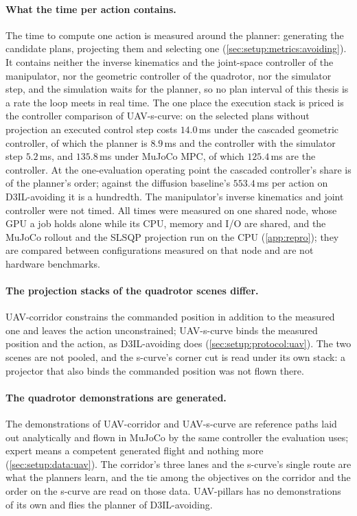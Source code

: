 \paragraph{What the time per action contains.} The time to compute one action is measured around the
planner: generating the candidate plans, projecting them and selecting one
(\autoref{sec:setup:metrics:avoiding}). It contains neither the inverse kinematics and the joint-space
controller of the manipulator, nor the geometric controller of the quadrotor, nor the simulator step,
and the simulation waits for the planner, so no plan interval of this thesis is a rate the loop meets in
real time. The one place the execution stack is priced is the controller comparison of UAV-s-curve: on
the selected plans without projection an executed control step costs $14.0$\,ms under the cascaded
geometric controller, of which the planner is $8.9$\,ms and the controller with the simulator step
$5.2$\,ms, and $135.8$\,ms under MuJoCo MPC, of which $125.4$\,ms are the controller. At the
one-evaluation operating point the cascaded controller's share is of the planner's order; against the
diffusion baseline's $553.4$\,ms per action on D3IL-avoiding it is a hundredth. The manipulator's
inverse kinematics and joint controller were not timed. All times were measured on one shared node,
whose GPU a job holds alone while its CPU, memory and I/O are shared, and the MuJoCo rollout and the
SLSQP projection run on the CPU (\autoref{app:repro}); they are compared between configurations
measured on that node and are not hardware benchmarks.

\paragraph{The projection stacks of the quadrotor scenes differ.} UAV-corridor constrains the
commanded position in addition to the measured one and leaves the action unconstrained; UAV-s-curve
binds the measured position and the action, as D3IL-avoiding does (\autoref{sec:setup:protocol:uav}).
The two scenes are not pooled, and the s-curve's corner cut is read under its own stack: a projector
that also binds the commanded position was not flown there.

\paragraph{The quadrotor demonstrations are generated.} The demonstrations of UAV-corridor and
UAV-s-curve are reference paths laid out analytically and flown in MuJoCo by the same controller the
evaluation uses; expert means a competent generated flight and nothing more
(\autoref{sec:setup:data:uav}). The corridor's three lanes and the s-curve's single route are what the
planners learn, and the tie among the objectives on the corridor and the order on the s-curve are read
on those data. UAV-pillars has no demonstrations of its own and flies the planner of D3IL-avoiding.

